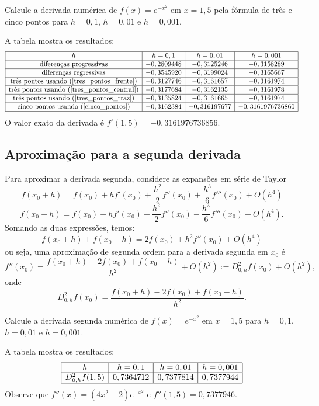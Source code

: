 \begin{ex}
Calcule a derivada numérica de $f(x)=e^{-x^2}$ em $x=1,5$ pela fórmula de três e cinco pontos para $h=0,1$, $h=0,01$ e $h=0,001$.
\end{ex}
\begin{sol}
A tabela mostra os resultados:
$$
\begin{array}{|c|c|c|c|}
\hline
 h & h=0,1 & h=0,01 & h=0,001\\
\hline
\hbox{diferenças progressivas} &-0,2809448 &-0,3125246 &- 0,3158289\\
\hline
\hbox{diferenças regressivas} &- 0,3545920 &- 0,3199024 &- 0,3165667\\
\hline
\hbox{três pontos usando (\ref{tres_pontos_frente})} &-0,3127746 &- 0,3161657 &-0,3161974\\
\hline
\hbox{três pontos usando (\ref{tres_pontos_central})} &- 0,3177684 &- 0,3162135 &-0,3161978\\
\hline
\hbox{três pontos usando (\ref{tres_pontos_traz})} &-0,3135824 &- 0,3161665 &-0,3161974\\
\hline
\hbox{cinco pontos usando (\ref{cinco_pontos})} &-0,3162384&-0,316197677 &-0,3161976736860\\
\hline
\end{array}
$$
O valor exato da derivada é $f'(1,5) = -0,3161976736856$.  
\end{sol}

\subsection{Aproximação para a segunda derivada}

Para aproximar a derivada segunda, considere as expansões em série de Taylor
$$
f(x_0+h)=f(x_0)+hf'(x_0)+\frac{h^2}{2}f''(x_0)+\frac{h^3}{6}f'''(x_0)+O(h^4)
$$
$$
f(x_0-h)=f(x_0)-hf'(x_0)+\frac{h^2}{2}f''(x_0)-\frac{h^3}{6}f'''(x_0)+O(h^4).
$$
Somando as duas expressões, temos:
$$
f(x_0+h)+f(x_0-h)=2f(x_0)+h^2f''(x_0)+O(h^4)
$$
ou seja, uma aproximação de segunda ordem para a derivada segunda em $x_0$ é
$$
f''(x_0)=\frac{f(x_0+h)-2f(x_0)+f(x_0-h)}{h^2}+O(h^2):=D^2_{0,h}f(x_0)+O(h^2),
$$
onde
$$
D^2_{0,h}f(x_0)=\frac{f(x_0+h)-2f(x_0)+f(x_0-h)}{h^2}.
$$
\begin{ex}
Calcule a derivada segunda numérica de $f(x)=e^{-x^2}$ em $x=1,5$ para $h=0,1$, $h=0,01$ e $h=0,001$.
\end{ex}
\begin{sol}
A tabela mostra os resultados:
$$
\begin{array}{|c|c|c|c|}
\hline
 h&h=0,1& h=0,01 & h=0,001\\
\hline
D^2_{0,h}f(1,5) & 0,7364712 & 0,7377814 & 0,7377944\\
\hline
\end{array}
$$
Observe que $f''(x)=(4x^2-2)e^{-x^2}$ e $f''(1,5)=0,7377946$.  
\end{sol}

